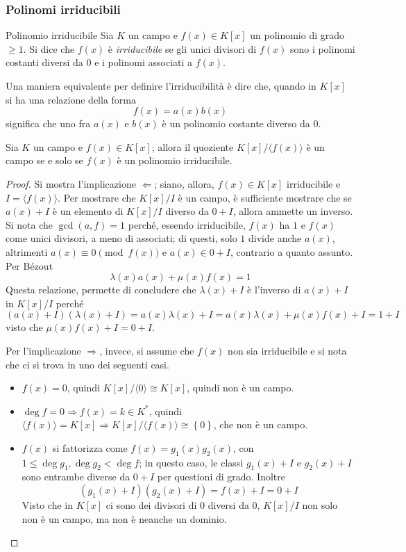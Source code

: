 \documentclass[11pt, a4paper]{scrartcl}
\theoremstyle{definition}
\numberwithin{esempio}{section}
\theoremstyle{definition}
\numberwithin{obs}{section}
\numberwithin{nota}{section}
\numberwithin{equation}{subsection}
\begin{document}
\subsubsection{Polinomi irriducibili}
\begin{definizione}
	{Polinomio irriducibile}{}
	Sia $K$ un campo e $f(x) \in K[x]$ un polinomio di grado $\ge 1$. Si dice che $f(x)$ \`e \textit{irriducibile} se gli unici divisori di $f(x)$ sono i polinomi costanti diversi da $0$ e i polinomi associati a $f(x)$.
\end{definizione}
\noindent Una maniera equivalente per definire l'irriducibilit\`a \`e dire che, quando in $K[x]$ si ha una relazione della forma
\[
f(x) = a(x) b(x)
\] 
significa che uno fra $a(x)$ e $b(x)$ \`e un polinomio costante diverso da $0$.
\begin{teorema}
	{}{}
	Sia $K$ un campo e $f(x) \in K[x]$; allora il quoziente $K[x] / \langle f(x) \rangle$ \`e un campo se e solo se $f(x)$ \`e un polinomio irriducibile.
	\begin{proof}
		Si mostra l'implicazione $\Leftarrow $; siano, allora, $f(x) \in K[x]$ irriducibile e $I = \langle f(x) \rangle$.
		Per mostrare che $K[x] / I$ \`e un campo, \`e sufficiente mostrare che se $a(x) + I$ \`e un elemento di $K[x] / I$ diverso da $0 + I$, allora ammette un inverso.
		Si nota che $\operatorname{gcd}(a,f) =1$ perch\'e, essendo irriducibile, $f(x)$ ha $1$ e $f(x)$ come unici divisori, a meno di associati; di questi, solo $1$ divide anche $a(x)$, altrimenti $a(x) \equiv 0 \pmod{ f(x) } $ e $a(x) \in 0 + I$, contrario a quanto assunto.
		Per B\'ezout
		\[
		\lambda (x)a(x) + \mu (x) f(x) = 1
		\] 
		Questa relazione, permette di concludere che $\lambda (x) + I$ \`e l'inverso di $a(x) + I$ in $K[x] / I$ perch\'e
		\[
			(a(x) + I ) (\lambda (x) + I ) = a(x) \lambda (x) + I = a(x) \lambda (x) + \mu (x) f(x) + I = 1 + I
		\] 
		visto che $\mu (x) f(x) + I = 0 + I$.

		Per l'implicazione $\Rightarrow $, invece, si assume che $f(x)$ non sia irriducibile e si nota che ci si trova in uno dei seguenti casi.
		\begin{itemize}
			\item  $f(x) = 0$, quindi $K[x] / \langle 0 \rangle \cong K[x]$, quindi non \`e un campo.
			\item $\operatorname{deg} f = 0 \Rightarrow  f(x) = k \in K^*$, quindi $\langle f(x) \rangle= K[x] \Rightarrow K[x] / \langle f(x) \rangle\cong \left\{ 0 \right\} $, che non \`e un campo.
			\item $f(x)$ si fattorizza come $f(x)=g_1(x)g_2(x)$, con $1\le \operatorname{deg} g_1,\operatorname{deg} g_2 < \operatorname{deg} f$; in questo caso, le classi $g_1(x) + I$ e $g_2(x) + I$ sono entrambe diverse da $0+I$ per questioni di grado.
				Inoltre
				\[
					(g_1(x) + I ) (g_2(x) + I) = f(x) + I = 0 + I
				\] 
				Visto che in $K[x]$ ci sono dei divisori di $0$ diversi da $0$, $K[x] / I$ non solo non \`e un campo, ma non \`e neanche un dominio.
		\end{itemize}
	\end{proof}
\end{teorema}
\end{document}
